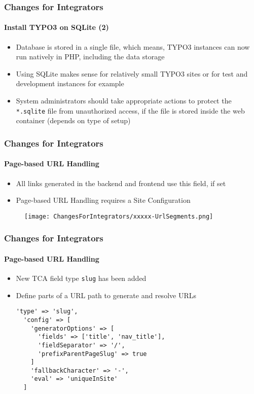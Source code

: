 \begin{frame}[fragile]
	\frametitle{Changes for Integrators}
	\framesubtitle{Install TYPO3 on SQLite (2)}

	\begin{itemize}
		\item Database is stored in a single file, which means, TYPO3 instances
			can now run natively in PHP, including the data storage
		\item Using SQLite makes sense for relatively small TYPO3 sites
			or for test and development instances for example
		\item System administrators should take appropriate actions to protect
			the \texttt{*.sqlite} file from unauthorized access, if the file
			is stored inside the web container (depends on type of setup)
	\end{itemize}

\end{frame}


\begin{frame}[fragile]
	\frametitle{Changes for Integrators}
	\framesubtitle{Page-based URL Handling}

	\begin{itemize}
		\item All links generated in the backend and frontend use this field,
			if set
		\item Page-based URL Handling requires a Site Configuration
	\end{itemize}

	\begin{figure}
		\texttt{[image: ChangesForIntegrators/xxxxx-UrlSegments.png]}
	\end{figure}

\end{frame}


\begin{frame}[fragile]
	\frametitle{Changes for Integrators}
	\framesubtitle{Page-based URL Handling}

	\lstset{basicstyle=\smaller\ttfamily}

	\begin{itemize}
		\item New TCA field type \texttt{slug} has been added
		\item Define parts of a URL path to generate and resolve URLs

		\begin{lstlisting}
'type' => 'slug',
  'config' => [
    'generatorOptions' => [
      'fields' => ['title', 'nav_title'],
      'fieldSeparator' => '/',
      'prefixParentPageSlug' => true
    ]
    'fallbackCharacter' => '-',
    'eval' => 'uniqueInSite'
  ]
		\end{lstlisting}
	\end{itemize}

\end{frame}

